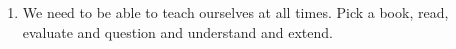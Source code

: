 \documentclass[12pt]{article}
\begin{document}
\begin{enumerate}
\item We need to be able to teach ourselves at all times. Pick a book, read, evaluate and question and understand and extend.


\end{enumerate}
\end{document}
